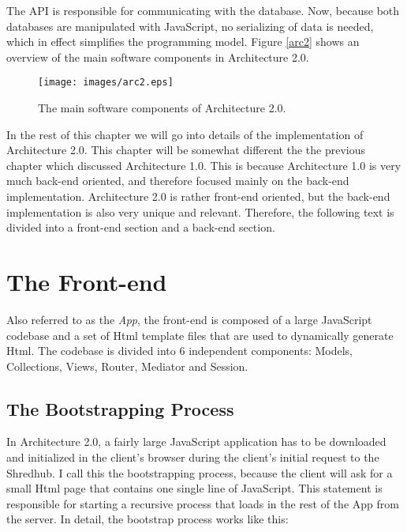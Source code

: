 The API is responsible for communicating with the database. Now, because both databases are manipulated with JavaScript, no serializing of data is needed, which in effect simplifies the programming model. Figure \vref{arc2} shows an overview of the main software components in Architecture 2.0.

 \begin{figure}[h]
  \centering
  \texttt{[image: images/arc2.eps]}
  \caption[sp.]
   {The main software components of Architecture 2.0.}
    \label{fig:arc2}
\end{figure}



In the rest of this chapter we will go into details of the implementation of  Architecture 2.0. This chapter will be somewhat different the the previous chapter which discussed Architecture 1.0. This is because Architecture 1.0 is very much back-end oriented, and therefore focused mainly on the back-end implementation. Architecture 2.0 is rather front-end oriented, but the back-end implementation is also very unique and relevant. Therefore, the following text is divided into a front-end section and a back-end section.

\section{The Front-end}
Also referred to as the \textit{App}, the front-end is composed of a large JavaScript codebase and a set of Html template files that are used to dynamically generate Html. The codebase is divided into 6 independent components: Models, Collections, Views, Router, Mediator and Session. 

\subsection{The Bootstrapping Process}
In Architecture 2.0, a fairly large JavaScript application has to be downloaded and initialized in the client's browser during the client's initial request to the Shredhub. I call this the bootstrapping process, because the client will ask for a small Html page that contains one single line of JavaScript. This statement is responsible for starting a recursive process that loads in the rest of the App from the server. In detail, the bootstrap process works like this:

